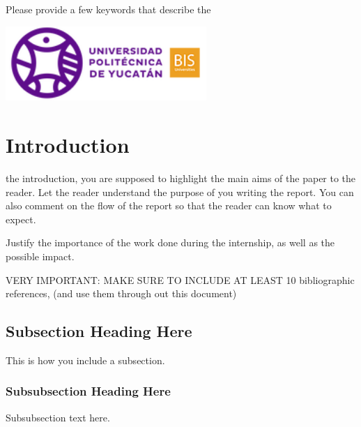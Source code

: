 \documentclass[peerreviewca]{IEEEtran}
\begin{document}
% 
\begin{IEEEkeywords}
  Please provide a few keywords that describe the 
\end{IEEEkeywords}

\vspace*{\fill}
\begin{center}
  \includegraphics[width=3in]{upy-logo}
\end{center}
\vspace{0.5in}
%
\IEEEpeerreviewmaketitle


\section{Introduction}
%


 the introduction, you are supposed to highlight the main
aims of the paper to the reader. Let the reader understand the purpose of you
writing the report. You can also comment on the flow of the report so that the
reader can know what to expect.

Justify the importance of the work done during the internship, as well as the
possible impact.

VERY IMPORTANT: MAKE SURE TO INCLUDE AT LEAST 10 bibliographic references, (and
use them through out this document)



\subsection{Subsection Heading Here}
This is how you include a subsection.


\subsubsection{Subsubsection Heading Here}

Subsubsection text here.
\end{document}
